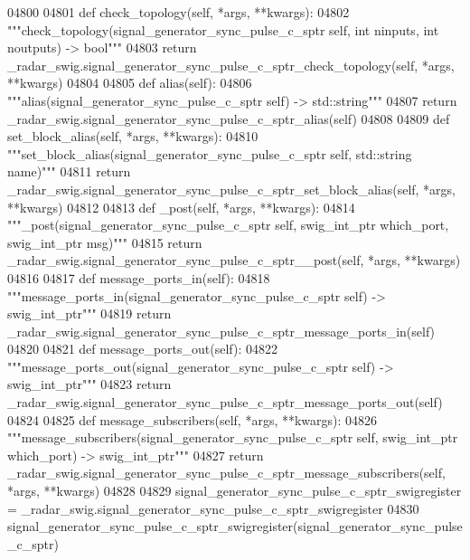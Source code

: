 \begin{DoxyCode}
{{{{{{{{{{{{{{{{04800 
04801     \textcolor{keyword}{def }check_topology(self, *args, **kwargs):
04802         \textcolor{stringliteral}{"""check\_topology(signal\_generator\_sync\_pulse\_c\_sptr self, int ninputs, int noutputs) -> bool"""}
04803         \textcolor{keywordflow}{return} \_radar\_swig.signal\_generator\_sync\_pulse\_c\_sptr\_check\_topology(self, *args, **kwargs)
04804 
04805     \textcolor{keyword}{def }alias(self):
04806         \textcolor{stringliteral}{"""alias(signal\_generator\_sync\_pulse\_c\_sptr self) -> std::string"""}
04807         \textcolor{keywordflow}{return} \_radar\_swig.signal\_generator\_sync\_pulse\_c\_sptr\_alias(self)
04808 
04809     \textcolor{keyword}{def }set_block_alias(self, *args, **kwargs):
04810         \textcolor{stringliteral}{"""set\_block\_alias(signal\_generator\_sync\_pulse\_c\_sptr self, std::string name)"""}
04811         \textcolor{keywordflow}{return} \_radar\_swig.signal\_generator\_sync\_pulse\_c\_sptr\_set\_block\_alias(self, *args, **kwargs)
04812 
04813     \textcolor{keyword}{def }_post(self, *args, **kwargs):
04814         \textcolor{stringliteral}{"""\_post(signal\_generator\_sync\_pulse\_c\_sptr self, swig\_int\_ptr which\_port, swig\_int\_ptr msg)"""}
04815         \textcolor{keywordflow}{return} \_radar\_swig.signal\_generator\_sync\_pulse\_c\_sptr\_\_post(self, *args, **kwargs)
04816 
04817     \textcolor{keyword}{def }message_ports_in(self):
04818         \textcolor{stringliteral}{"""message\_ports\_in(signal\_generator\_sync\_pulse\_c\_sptr self) -> swig\_int\_ptr"""}
04819         \textcolor{keywordflow}{return} \_radar\_swig.signal\_generator\_sync\_pulse\_c\_sptr\_message\_ports\_in(self)
04820 
04821     \textcolor{keyword}{def }message_ports_out(self):
04822         \textcolor{stringliteral}{"""message\_ports\_out(signal\_generator\_sync\_pulse\_c\_sptr self) -> swig\_int\_ptr"""}
04823         \textcolor{keywordflow}{return} \_radar\_swig.signal\_generator\_sync\_pulse\_c\_sptr\_message\_ports\_out(self)
04824 
04825     \textcolor{keyword}{def }message_subscribers(self, *args, **kwargs):
04826         \textcolor{stringliteral}{"""message\_subscribers(signal\_generator\_sync\_pulse\_c\_sptr self, swig\_int\_ptr which\_port) ->
       swig\_int\_ptr"""}
04827         \textcolor{keywordflow}{return} \_radar\_swig.signal\_generator\_sync\_pulse\_c\_sptr\_message\_subscribers(self, *args, **kwargs)
04828 
04829 signal\_generator\_sync\_pulse\_c\_sptr\_swigregister = 
      \_radar\_swig.signal\_generator\_sync\_pulse\_c\_sptr\_swigregister
04830 signal_generator_sync_pulse_c_sptr_swigregister(signal\_generator\_sync\_pulse\_c\_sptr)
}}}}}}}}}}}}}}}}
\end{DoxyCode}
